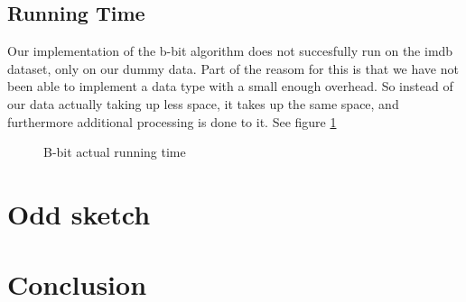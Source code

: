 \documentclass[a4paper,11pt]{article}
\begin{document}
\subsection{Running Time}
Our implementation of the b-bit algorithm does not succesfully run on the imdb dataset, only on our dummy data. Part of the reasom for this is that we have not been able to implement a data type with a small enough overhead. So instead of our data actually taking up less space, it takes up the same space, and furthermore additional processing is done to it. See figure \ref{fig:bbit_at}\\

\begin{figure}[!htpb]
    \begin{center}
        
        \caption{B-bit actual running time}
        \label{fig:bbit_at}
    \end{center}
\end{figure}


\section{Odd sketch}

\section{Conclusion}
\newpage

\end{document}
